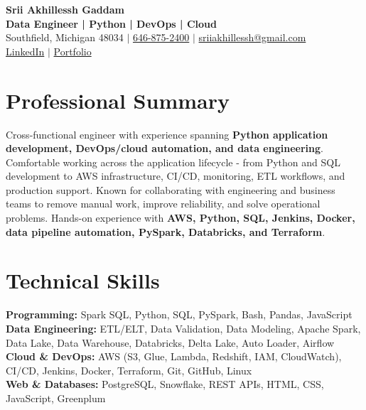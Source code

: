 \documentclass[letterpaper,10pt]{article}
\begin{document}
\fontsize{9.35pt}{10.45pt}\selectfont

\begin{center}
    {\LARGE \textbf{Srii Akhillessh Gaddam}} \\[-1pt]
    \textbf{Data Engineer | Python | DevOps | Cloud} \\[2pt]
    Southfield, Michigan 48034 $|$
    \href{tel:6468752400}{646-875-2400} $|$
    \href{mailto:sriiakhillessh@gmail.com}{sriiakhillessh@gmail.com} \\[1pt]
    \href{https://www.linkedin.com/in/srii-akhiilessh-gaddam-b48668191/}{LinkedIn} $|$
    \href{https://sriiakhillesshg.github.io/portfolio/}{Portfolio}
\end{center}
\vspace{-8pt}

\section{Professional Summary}
\small{Cross-functional engineer with experience spanning \textbf{Python application development, DevOps/cloud automation, and data engineering}. Comfortable working across the application lifecycle - from Python and SQL development to AWS infrastructure, CI/CD, monitoring, ETL workflows, and production support. Known for collaborating with engineering and business teams to remove manual work, improve reliability, and solve operational problems. Hands-on experience with \textbf{AWS, Python, SQL, Jenkins, Docker, data pipeline automation, PySpark, Databricks, and Terraform}.}

\section{Technical Skills}
\small{
\textbf{Programming:} Spark SQL, Python, SQL, PySpark, Bash, Pandas, JavaScript \\
\textbf{Data Engineering:} ETL/ELT, Data Validation, Data Modeling, Apache Spark, Data Lake, Data Warehouse, Databricks, Delta Lake, Auto Loader, Airflow \\
\textbf{Cloud \& DevOps:} AWS (S3, Glue, Lambda, Redshift, IAM, CloudWatch), CI/CD, Jenkins, Docker, Terraform, Git, GitHub, Linux \\
\textbf{Web \& Databases:} PostgreSQL, Snowflake, REST APIs, HTML, CSS, JavaScript, Greenplum
}
\end{document}
